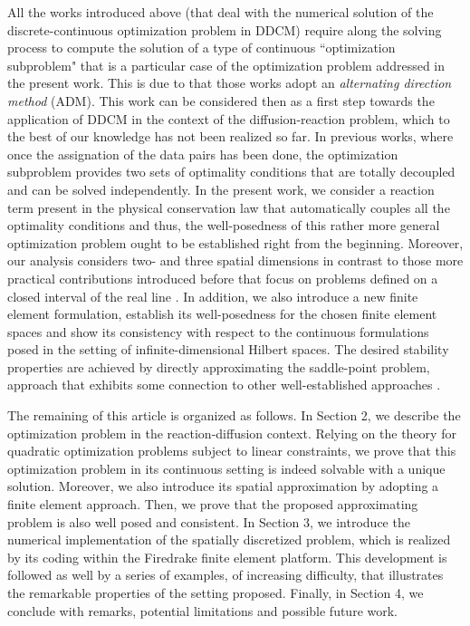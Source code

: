 All the works introduced above (that deal with the numerical solution of the discrete-continuous optimization problem in DDCM) require along the solving process to compute the solution of a type of continuous ``optimization subproblem" that is a particular case of the optimization problem addressed in the present work. This is due to that those works adopt an \textit{alternating direction method} (ADM). This work can be considered then as a first step towards the application of DDCM in the context of the diffusion-reaction problem, which to the best of our knowledge has not been realized so far. In previous works, where once the assignation of the data pairs has been done, the optimization subproblem provides two sets of optimality conditions that are totally decoupled and can be solved independently. In the present work, we consider a reaction term present in the physical conservation law that automatically couples all the optimality conditions and thus, the well-posedness of this rather more general optimization problem ought to be established right from the beginning. Moreover, our analysis considers two- and three spatial dimensions in contrast to those more practical contributions introduced before that focus on problems defined on a closed interval of the real line \cite{Gebhardt:2020a, Gebhardt:2020b, Gebhardt2024a, Gebhardt2024b}. In addition, we also introduce a new finite element formulation, establish its well-posedness for the chosen finite element spaces and show its consistency with respect to the continuous formulations posed in the setting of infinite-dimensional Hilbert spaces. The desired stability properties are achieved by directly approximating the saddle-point problem, approach that exhibits some connection to other well-established approaches \cite{Masud2002, Bochev2006, Badia2010, Burman2023}. 

The remaining of this article is organized as follows. In Section 2, we describe the optimization problem in the reaction-diffusion context. Relying on the theory for quadratic optimization problems subject to linear constraints, we prove that this optimization problem in its continuous setting is indeed solvable with a unique solution. Moreover, we also introduce its spatial approximation by adopting a finite element approach. Then, we prove that the proposed approximating problem is also well posed and consistent. In Section 3, we introduce the numerical implementation of the spatially discretized problem, which is realized by its coding within the Firedrake finite element platform. 
This development is followed as well by a series of examples, of increasing difficulty, that illustrates the remarkable properties of the setting proposed. Finally, in Section 4, we conclude with remarks, potential limitations and possible future work.  
